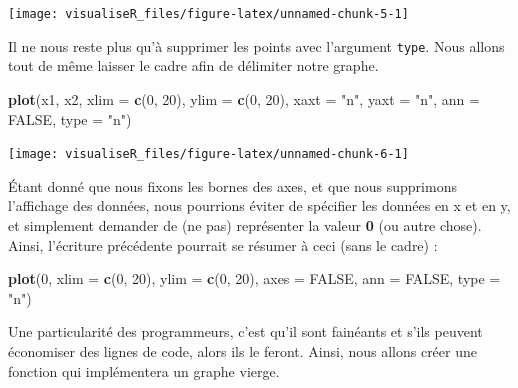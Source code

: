 \documentclass[]{article}
\newenvironment{Shaded}{\begin{snugshade}}{\end{snugshade}}
\newcommand{\DataTypeTok}[1]{\textcolor[rgb]{0.13,0.29,0.53}{#1}}
\newcommand{\DecValTok}[1]{\textcolor[rgb]{0.00,0.00,0.81}{#1}}
\newcommand{\KeywordTok}[1]{\textcolor[rgb]{0.13,0.29,0.53}{\textbf{#1}}}
\newcommand{\NormalTok}[1]{#1}
\newcommand{\OtherTok}[1]{\textcolor[rgb]{0.56,0.35,0.01}{#1}}
\newcommand{\StringTok}[1]{\textcolor[rgb]{0.31,0.60,0.02}{#1}}
\begin{document}
\begin{center}\texttt{[image: visualiseR\_files/figure-latex/unnamed-chunk-5-1]} \end{center}

Il ne nous reste plus qu'à supprimer les points avec l'argument \texttt{type}. Nous allons tout de même laisser le cadre afin de délimiter notre graphe.

\begin{Shaded}
\begin{Highlighting}[]
\KeywordTok{plot}\NormalTok{(x1, x2, }\DataTypeTok{xlim =} \KeywordTok{c}\NormalTok{(}\DecValTok{0}\NormalTok{, }\DecValTok{20}\NormalTok{), }\DataTypeTok{ylim =} \KeywordTok{c}\NormalTok{(}\DecValTok{0}\NormalTok{, }\DecValTok{20}\NormalTok{), }\DataTypeTok{xaxt =} \StringTok{"n"}\NormalTok{, }\DataTypeTok{yaxt =} \StringTok{"n"}\NormalTok{, }\DataTypeTok{ann =} \OtherTok{FALSE}\NormalTok{, }\DataTypeTok{type =} \StringTok{"n"}\NormalTok{)}
\end{Highlighting}
\end{Shaded}

\begin{center}\texttt{[image: visualiseR\_files/figure-latex/unnamed-chunk-6-1]} \end{center}

Étant donné que nous fixons les bornes des axes, et que nous supprimons l'affichage des données, nous pourrions éviter de spécifier les données en x et en y, et simplement demander de (ne pas) représenter la valeur \textbf{0} (ou autre chose). Ainsi, l'écriture précédente pourrait se résumer à ceci (sans le cadre) :

\begin{Shaded}
\begin{Highlighting}[]
\KeywordTok{plot}\NormalTok{(}\DecValTok{0}\NormalTok{, }\DataTypeTok{xlim =} \KeywordTok{c}\NormalTok{(}\DecValTok{0}\NormalTok{, }\DecValTok{20}\NormalTok{), }\DataTypeTok{ylim =} \KeywordTok{c}\NormalTok{(}\DecValTok{0}\NormalTok{, }\DecValTok{20}\NormalTok{), }\DataTypeTok{axes =} \OtherTok{FALSE}\NormalTok{, }\DataTypeTok{ann =} \OtherTok{FALSE}\NormalTok{, }\DataTypeTok{type =} \StringTok{"n"}\NormalTok{)}
\end{Highlighting}
\end{Shaded}

Une particularité des programmeurs, c'est qu'il sont fainéants et s'ils peuvent économiser des lignes de code, alors ils le feront. Ainsi, nous allons créer une fonction qui implémentera un graphe vierge.
\end{document}
